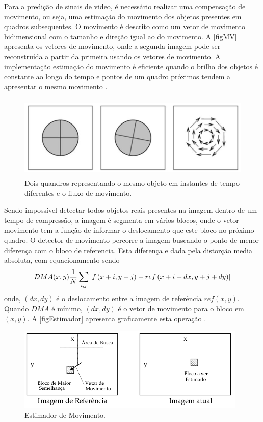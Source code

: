 Para a predição de sinais de video, é necessário realizar uma compensação de movimento, ou seja, uma estimação do movimento dos objetos presentes em quadros subsequentes. O movimento é descrito como um vetor de movimento bidimensional com o tamanho e direção igual ao do movimento. A \autoref{figMV} apresenta os vetores de movimento, onde a segunda imagem pode ser reconstruída a partir da primeira usando os vetores de movimento. A implementação estimação do movimento é eficiente quando o brilho dos objetos é constante ao longo do tempo e pontos de um quadro próximos tendem a apresentar o mesmo movimento \cite{ogeMatlab} \cite{tvDigitalUSP}.

\begin{figure}[htb]
	\caption{\label{figMV} Dois quandros representando o mesmo objeto em instantes de tempo diferentes e o fluxo de movimento.}
	\begin{center}
		\includegraphics[height=4cm]{figMV.png}
	\end{center}
\end{figure}

Sendo impossível detectar todos objetos reais presentes na imagem dentro de um tempo de compressão, a imagem é segmenta em vários blocos, onde o vetor movimento tem a função de informar o deslocamento que este bloco no próximo quadro. O detector de movimento percorre a imagem buscando o ponto de menor diferença com o bloco de referencia. Esta diferença e dada pela distorção media absoluta, com equacionamento sendo
\begin{equation}
DMA(x,y)\displaystyle \frac{\displaystyle 1 }{ \displaystyle N}\sum_{i,j}\left|f\left(x+i,y+j\right)-ref\left(x+i+dx,y+j+dy\right)\right|
\end{equation}
onde, $(dx,dy)$ é o deslocamento entre a imagem de referência $ref(x,y)$. Quando $DMA$ é mínimo, $(dx,dy)$ é o vetor de movimento para o bloco em $(x,y)$. A \autoref{figEstimador} apresenta graficamente esta operação \cite{tvDigitalUSP}.

\begin{figure}[htb]
	\caption{\label{figEstimador} Estimador de Movimento.}
	\begin{center}
		\includegraphics[height=4cm]{figEstimador.png}
	\end{center}
\end{figure}

